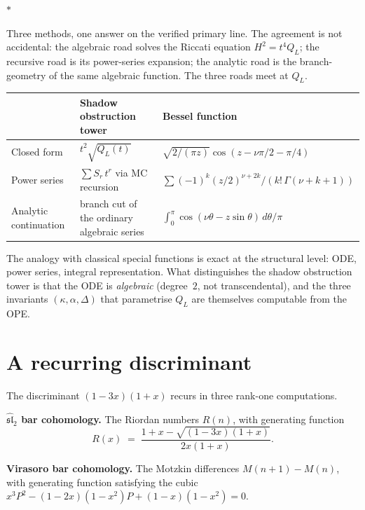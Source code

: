 \documentclass[11pt]{article}
\newcommand{\fsl}{\mathfrak{sl}}
\newcommand{\sep}{\bigskip\begin{center}$*$\end{center}\medskip}
\begin{document}
\sep

Three methods, one answer on the verified primary line.  The
agreement is not accidental: the algebraic road solves the
Riccati equation $H^2 = t^4 Q_L$; the recursive road is its
power-series expansion; the analytic road is the branch-geometry
of the same algebraic function.  The three roads meet at $Q_L$.

\begin{center}
\small
\renewcommand{\arraystretch}{1.15}
\begin{tabular}{@{}lll@{}}
& \textbf{Shadow obstruction tower}
  & \textbf{Bessel function} \\
\hline
Closed form
  & $t^2\sqrt{Q_L(t)}$
  & $\sqrt{2/(\pi z)}\cos(z - \nu\pi/2 - \pi/4)$ \\[3pt]
Power series
  & $\sum S_r\,t^r$ via MC recursion
  & $\sum (-1)^k (z/2)^{\nu+2k}/(k!\,\Gamma(\nu{+}k{+}1))$ \\[3pt]
Analytic continuation
  & branch cut of the ordinary algebraic series
  & $\int_0^\pi \cos(\nu\theta - z\sin\theta)\,d\theta/\pi$
\end{tabular}
\end{center}

\medskip

The analogy with classical special functions is exact at the
structural level: ODE, power series, integral representation.
What distinguishes the shadow obstruction tower is that the ODE is
\emph{algebraic} (degree~$2$, not transcendental), and the
three invariants $(\kappa, \alpha, \Delta)$ that parametrise
$Q_L$ are themselves computable from the OPE.


\section{A recurring discriminant}
\label{sec:universal-discriminant}

The discriminant $(1-3x)(1+x)$ recurs in three rank-one
computations.

\medskip
\noindent\textbf{$\widehat{\fsl}_2$ bar cohomology.}\enspace
The Riordan numbers $R(n)$, with generating function
\[
R(x) \;=\; \frac{1+x - \sqrt{(1-3x)(1+x)}}{2x(1+x)}.
\]

\medskip
\noindent\textbf{Virasoro bar cohomology.}\enspace
The Motzkin differences $M(n{+}1) - M(n)$, with generating
function satisfying the cubic
$x^3 P^2 - (1{-}2x)(1{-}x^2)P + (1{-}x)(1{-}x^2) = 0$.
\end{document}
